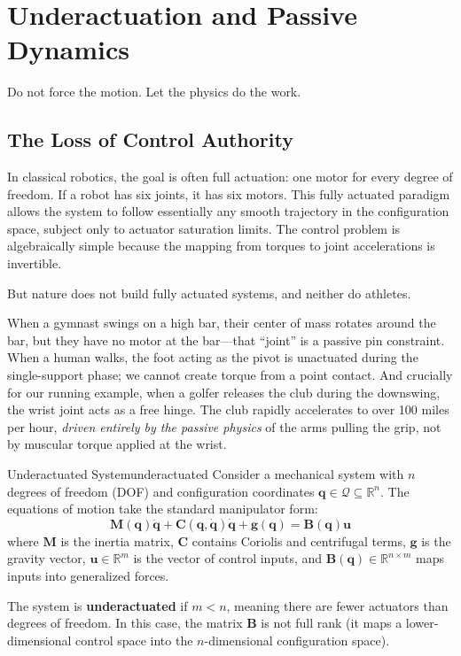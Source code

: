 \documentclass[12pt, openany]{book}
\theoremstyle{plain}
\newcommand{\control}{\bm{u}}
\newcommand{\configspace}{\mathcal{Q}}
\newcommand{\Reals}{\mathbb{R}}
\newcommand{\Bmat}{\bm{B}}
\newcommand{\Mmat}{\bm{M}}
\newcommand{\Cmat}{\bm{C}}
\newcommand{\gvec}{\bm{g}}
\begin{document}
\setcounter{chapter}{4}

\chapter{Underactuation and Passive Dynamics}

\epigraph{%
  Do not force the motion. Let the physics do the work.
}{}

\vspace{0.5cm}

\section{The Loss of Control Authority}

In classical robotics, the goal is often full actuation: one motor for every degree of freedom. If a robot has six joints, it has six motors. This fully actuated paradigm allows the system to follow essentially any smooth trajectory in the configuration space, subject only to actuator saturation limits. The control problem is algebraically simple because the mapping from torques to joint accelerations is invertible.

But nature does not build fully actuated systems, and neither do athletes.

When a gymnast swings on a high bar, their center of mass rotates around the bar, but they have no motor at the bar---that ``joint'' is a passive pin constraint. When a human walks, the foot acting as the pivot is unactuated during the single-support phase; we cannot create torque from a point contact. And crucially for our running example, when a golfer releases the club during the downswing, the wrist joint acts as a free hinge. The club rapidly accelerates to over 100 miles per hour, \emph{driven entirely by the passive physics} of the arms pulling the grip, not by muscular torque applied at the wrist.

\begin{definition}{Underactuated System}{underactuated}
  Consider a mechanical system with $n$ degrees of freedom (DOF) and configuration coordinates $\bm{q} \in \configspace \subseteq \Reals^n$. The equations of motion take the standard manipulator form:
  \begin{equation}
    \Mmat(\bm{q})\ddot{\bm{q}} + \Cmat(\bm{q}, \dot{\bm{q}})\dot{\bm{q}} + \gvec(\bm{q}) = \Bmat(\bm{q}) \control
  \end{equation}
  where $\Mmat$ is the inertia matrix, $\Cmat$ contains Coriolis and centrifugal terms, $\gvec$ is the gravity vector, $\control \in \Reals^m$ is the vector of control inputs, and $\Bmat(\bm{q}) \in \Reals^{n \times m}$ maps inputs into generalized forces.
  
  The system is \textbf{underactuated} if $m < n$, meaning there are fewer actuators than degrees of freedom. In this case, the matrix $\Bmat$ is not full rank (it maps a lower-dimensional control space into the $n$-dimensional configuration space).
\end{definition}
\end{document}
